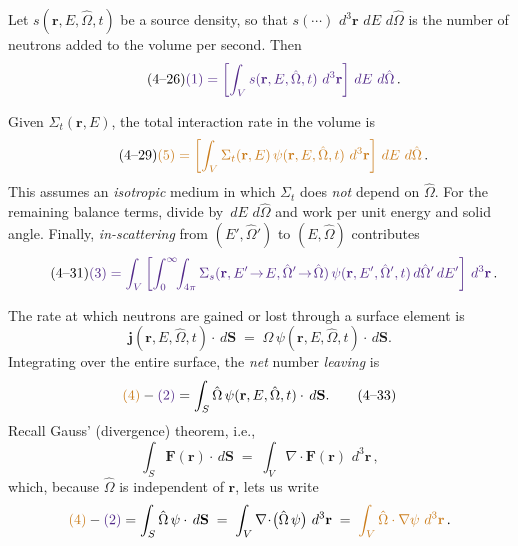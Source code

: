 \documentclass[compact]{ne630handout}
\newcommand{\br}{\mathbf{r}}
\newcommand{\bO}{\hat{\Omega}}
\newcommand{\jj}{\mathbf{j}}
\newcommand{\angflux}{\psi}
\newcommand{\dV}{\,d^3\br}
\newcommand{\dE}{\,dE}
\newcommand{\dO}{\,d\hat{\Omega}}
\newcommand{\ds}{\,d\mathbf{S}}
\begin{document}
\begin{handoutflow}


Let $s(\br, E, \bO, t)$ be a source density, so that $s(\cdots)\,\dV\,\dE\,\dO$ is the number of neutrons
added to the volume per second. Then
\begin{equation*}
\tag{4--26}
 \textcolor{wcprimary}{\text{(1)}  = \left[ \int_V s(\br,E,\bO,t)\,\dV \right] \dE\,\dO} \, .
\end{equation*}



Given $\Sigma_t(\br,E)$,
the total interaction rate in the volume is
\begin{equation*}
\tag{4--29}
  \textcolor{wcalerted}{\text{(5)} = \left[ \int_V \Sigma_t(\br,E)\, \angflux(\br,E,\bO,t)\,\dV \right] \dE\,\dO } \, .
\end{equation*}
This assumes an {\it isotropic} medium in which $\Sigma_t$ does {\it not} depend on $\bO$.
For the remaining balance terms, divide by $\dE\,\dO$ and work per unit energy and solid angle. Finally, {\it in-scattering} from $(E',\bO')$ to $(E,\bO)$ contributes
\begin{equation}
\tag{4--31}
   \textcolor{wcprimary}{\text{(3)} = \int_V \left[ \int_0^\infty \!\!\int_{4\pi} \Sigma_s(\br, E'\!\to\!E, \bO'\!\to\!\bO)\,
  \angflux(\br, E', \bO', t) \dO' \dE' \right] \dV } \, .
\end{equation}



The rate at which neutrons are gained or lost through a surface element is
\begin{equation}
\tag{4--32}
  \jj(\br,E,\bO,t)\cdot \ds \;=\; \bO\, \angflux(\br,E,\bO,t)\cdot \ds.
\end{equation}
Integrating over the entire surface, the {\it net} number \emph{leaving} is
\begin{equation*}
   \textcolor{wcalerted}{\text{(4)}}  - \textcolor{wcprimary}{\text{(2)}} = \int_S \bO\, \angflux(\br,E,\bO,t)\cdot \ds .
  \tag{4--33}
\end{equation*}
Recall Gauss' (divergence) theorem, i.e.,
\begin{equation*}
\tag{4--34}
  \int_S \mathbf{F}(\br)\cdot \ds \;=\; \int_V \nabla\!\cdot\! \mathbf{F}(\br)\, \dV \, ,
\end{equation*}
which, because $\bO$ is independent of $\br$, lets us write
\begin{equation*}
 \textcolor{wcalerted}{\text{(4)}}  - \textcolor{wcprimary}{\text{(2)}}
 = \int_S \bO\, \angflux\cdot \ds
  \;=\; \int_V \nabla\!\cdot\!\big(\bO\, \angflux\big)\, \dV
  \;=\; \textcolor{wcalerted}{ \int_V \bO\cdot \nabla \angflux \, \dV } \, .
\end{equation*}


\end{handoutflow}
\end{document}
